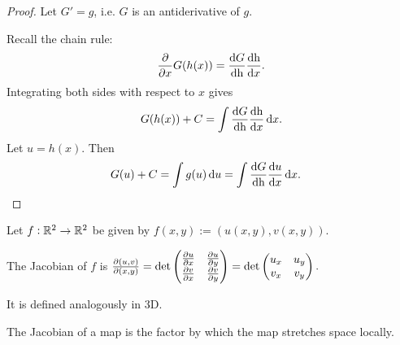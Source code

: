 \begin{proof}
  Let $G' = g$, i.e. $G$ is an antiderivative of $g$.

  Recall the chain rule:
  \begin{align*}
    \ddx G(h(x)) = \frac{\dG}{\dh} \frac{\dh}{\dx}.
  \end{align*}
  Integrating both sides with respect to $x$ gives
  \begin{align*}
    G(h(x)) + C = \int \frac{\dG}{\dh} \frac{\dh}{\dx} \dx.
  \end{align*}
  Let $u = h(x)$. Then
  \begin{align*}
    G(u) + C &= \int g(u) \du
              = \int \frac{\dG}{\dh} \frac{\du}{\dx} \dx.
  \end{align*}
\end{proof}

\begin{definition*}[Jacobian]
  Let $f:\mathbb{R}^2 \to \mathbb{R}^2$ be given by $f(x, y) := (u(x, y), v(x, y))$.

  The Jacobian of $f$ is
  $
  \frac{\partial(u, v)}{\partial(x, y)} =
  \det \begin{pmatrix}\frac{\partial u}{\partial x} & \frac{\partial u}{\partial y}\\\frac{\partial v}{\partial x} & \frac{\partial v}{\partial y}\\ \end{pmatrix}
  = \det \begin{pmatrix}u_x & u_y\\v_x & v_y\\ \end{pmatrix}.
  $

  It is defined analogously in 3D.
\end{definition*}

\begin{theorem}\label{stretch-factor-is-jacobian}
  The Jacobian of a map is the factor by which the map stretches space locally.
\end{theorem}

